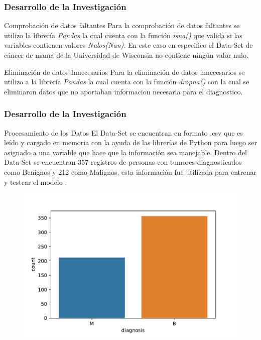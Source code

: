 \documentclass[xcolor=dvipsnames,xcolor=table]{beamer} %
\begin{document}
\begin{frame}
	\frametitle{Desarrollo de la Investigación}
	\begin{block}{Comprobación de datos faltantes}\justifying
		Para la comprobación de datos faltantes se utilizo la librería \textit{Pandas} la cual cuenta con la función \textit{isna()} que valida si las variables contienen valores \textit{Nulos(Nan)}. En este caso en especifico el Data-Set de cáncer de mama de la Universidad de Wisconsin no contiene ningún valor nulo.
	\end{block}
	\begin{block}{Eliminación de datos Innecesarios}\justifying
		Para la eliminación de datos innecesarios se utilizo a la librería \textit{Pandas} la cual cuenta con la función \textit{dropna()} con la cual se eliminaron datos que no aportaban informacion necesaria para el diagnostico.
	\end{block}
\end{frame}
\begin{frame}
	\frametitle{Desarrollo de la Investigación}
	\begin{block}{Procesamiento de los Datos}\justifying
		El Data-Set se encuentran en formato .csv que es leído y cargado en memoria con la ayuda de las librerías de Python para luego ser asignado a una variable que hace que la información sea manejable. Dentro del Data-Set se encuentran  357 registros  de personas con tumores diagnosticados  como Benignos  y 212 como Malignos, esta información fue utilizada para entrenar y testear el modelo \cite{b4}.
	\end{block}
	\begin{figure}[h!]
	\centering
	\includegraphics[width=0.5\linewidth]{PROYECTO/imgs/output}
	\end{figure}

\end{frame}
\end{document}
